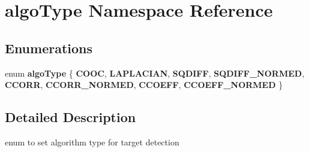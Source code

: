 \hypertarget{namespacealgo_type}{}\section{algo\+Type Namespace Reference}
\label{namespacealgo_type}
\subsection*{Enumerations}
\begin{DoxyCompactItemize}
\item 
\mbox{\label{namespacealgo_type_a3a8b99ab772e18c650e34b6e08cbd4af}} 
enum {\bfseries algo\+Type} \{ \newline
{\bfseries C\+O\+OC}, 
{\bfseries L\+A\+P\+L\+A\+C\+I\+AN}, 
{\bfseries S\+Q\+D\+I\+FF}, 
{\bfseries S\+Q\+D\+I\+F\+F\+\_\+\+N\+O\+R\+M\+ED}, 
\newline
{\bfseries C\+C\+O\+RR}, 
{\bfseries C\+C\+O\+R\+R\+\_\+\+N\+O\+R\+M\+ED}, 
{\bfseries C\+C\+O\+E\+FF}, 
{\bfseries C\+C\+O\+E\+F\+F\+\_\+\+N\+O\+R\+M\+ED}
 \}
\end{DoxyCompactItemize}


\subsection{Detailed Description}
enum to set algorithm type for target detection 